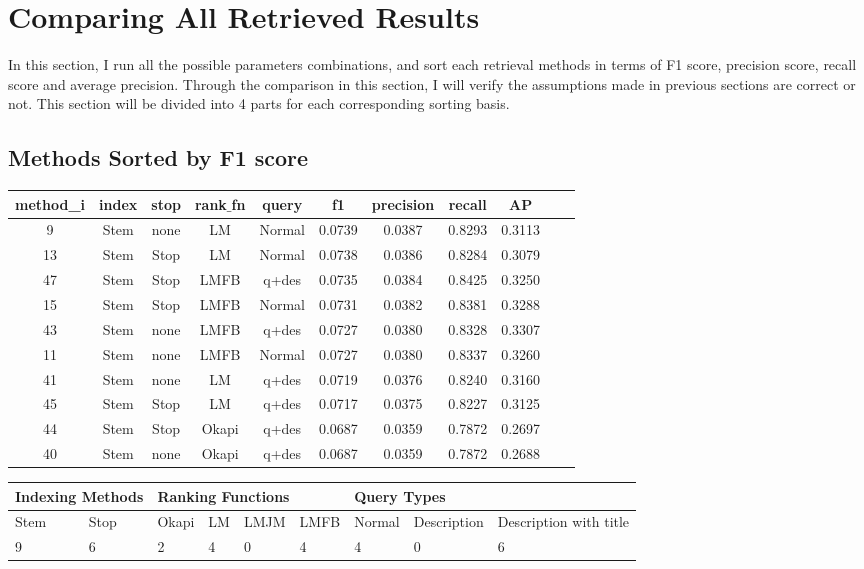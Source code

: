 \documentclass[10pt, a4paper]{article}
\begin{document}
\section{Comparing All Retrieved Results}
\label{section:5}
In this section, I run all the possible parameters combinations, and sort each retrieval methods in terms of F1 score, precision score, recall score and average precision. Through the comparison in this section, I will verify the assumptions made in previous sections are correct or not. This section will be divided into 4 parts for each corresponding sorting basis.

\subsection{Methods Sorted by F1 score}

\begin{center}
\begin{tabular}{ |c|c|c|c|c|c|c|c|c|c|c| } 
\hline
method_i  & index & stop & rank$\_$fn & query & f1 & precision & recall & AP \\
\hline
 9 & Stem & none & LM & Normal & 0.0739 &  0.0387 & 0.8293 & 0.3113 \\ 
13 & Stem & Stop & LM & Normal & 0.0738 &  0.0386 & 0.8284 & 0.3079 \\ 
47 & Stem & Stop & LMFB &  q+des & 0.0735 &  0.0384 & 0.8425 & 0.3250 \\ 
15 & Stem & Stop & LMFB & Normal & 0.0731 &  0.0382 & 0.8381 & 0.3288 \\ 
43 & Stem & none & LMFB &  q+des & 0.0727 &  0.0380 & 0.8328 & 0.3307 \\ 
11 & Stem & none & LMFB & Normal & 0.0727 &  0.0380 & 0.8337 & 0.3260 \\ 
41 & Stem & none & LM &  q+des & 0.0719 &  0.0376 & 0.8240 & 0.3160 \\ 
45 & Stem & Stop & LM &  q+des & 0.0717 &  0.0375 & 0.8227 & 0.3125 \\ 
44 & Stem & Stop &  Okapi &  q+des & 0.0687 &  0.0359 & 0.7872 & 0.2697 \\ 
40 & Stem & none &  Okapi &  q+des & 0.0687 &  0.0359 & 0.7872 & 0.2688 \\ 
\hline
\end{tabular}
\end{center}

\begin{center}
\begin{tabular}{|l|l|l|l|l|l|l|l|l|}
\hline
\multicolumn{2}{|l|}{Indexing Methods} & \multicolumn{4}{l|}{Ranking Functions} & \multicolumn{3}{l|}{Query Types}              \\ \hline
Stem               & Stop              & Okapi     & LM     & LMJM    & LMFB    & Normal & Description & Description with title \\ \hline
9                  & 6                 & 2         & 4      & 0       & 4       & 4      & 0           & 6                      \\ \hline
\end{tabular}
\end{center}
\end{document}
